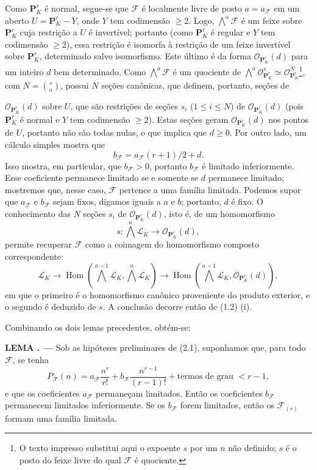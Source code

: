 \documentclass[11pt,twoside,openany]{book}
\numberwithin{equation}{section}
\newcommand{\src}[1]{%
  \phantomsection\hypertarget{src:#1}{}%
  \marginpar{\raggedleft\footnotesize\sffamily #1}%
}
\theoremstyle{plain}
\theoremstyle{definition}
\theoremstyle{remark}
\newcommand{\result}[2]{%
  \par\medskip\noindent\textbf{#1%
  \if\relax\detokenize{#2}\relax\else\space#2\fi. ---}\enspace
}
\newcommand{\FgaUnitKey}{frontmatter}
\renewcommand{\src}[1]{%
  \phantomsection\hypertarget{src:\FgaUnitKey:#1}{}%
  \marginpar{\raggedleft\footnotesize\sffamily #1}%
}
\begin{document}
Como $\mathbf P^r_K$ é normal, segue-se que $\mathcal F$ é localmente livre de
posto $a=a_{\mathcal F}$ em um aberto $U=\mathbf P^r_K-Y$, onde $Y$ tem
codimensão $\geq2$. Logo, $\bigwedge^a\mathcal F$ é um feixe sobre
$\mathbf P^r_K$ cuja restrição a $U$ é invertível; portanto (como
$\mathbf P^r_K$ é regular e $Y$ tem codimensão $\geq2$), essa restrição é
isomorfa à restrição de um feixe invertível sobre $\mathbf P^r_K$, determinado
salvo isomorfismo. Este último é da forma $\mathcal O_{\mathbf P^r_K}(d)$ para um
inteiro $d$ bem determinado. Como $\bigwedge^a\mathcal F$ é um quociente de
$\bigwedge^a\mathcal O_{\mathbf P^r_K}^{s}\simeq
\mathcal O_{\mathbf P^r_K}^{N}$\footnote{O texto impresso substitui aqui o
expoente $s$ por um $n$ não definido; $s$ é o posto do feixe livre do qual
$\mathcal F$ é quociente.}, com $N=\binom{s}{a}$, possui $N$ seções canônicas,
que definem, portanto, seções de
\src{257}
$\mathcal O_{\mathbf P^r_K}(d)$ sobre $U$, que são restrições de seções
$s_i$ ($1\leq i\leq N$) de $\mathcal O_{\mathbf P^r_K}(d)$ (pois
$\mathbf P^r_K$ é normal e $Y$ tem codimensão $\geq2$). Estas seções
geram $\mathcal O_{\mathbf P^r_K}(d)$ nos pontos de $U$, portanto não são
todas nulas, o que implica que $d\geq0$. Por outro lado, um cálculo simples
mostra que
\[
b_{\mathcal F}=a_{\mathcal F}(r+1)/2+d.
\]
Isso mostra, em particular, que $b_{\mathcal F}>0$, portanto
$b_{\mathcal F}$ é limitado inferiormente. Esse coeficiente permanece limitado
se e somente se $d$ permanece limitado; mostremos que, nesse caso, $\mathcal F$
pertence a uma família limitada. Podemos supor que $a_{\mathcal F}$ e
$b_{\mathcal F}$ sejam fixos, digamos iguais a $a$ e $b$; portanto, $d$ é fixo.
O conhecimento das $N$ seções
$s_i$ de $\mathcal O_{\mathbf P^r_K}(d)$, isto é, de um homomorfismo
\[
s:\bigwedge^a\mathcal L_K\longrightarrow\mathcal O_{\mathbf P^r_K}(d),
\]
permite recuperar $\mathcal F$ como a coimagem do homomorfismo composto
correspondente:
\[
\mathcal L_K\longrightarrow
\operatorname{Hom}\!\left(\bigwedge^{a-1}\mathcal L_K,
\bigwedge^a\mathcal L_K\right)\longrightarrow
\operatorname{Hom}\!\left(\bigwedge^{a-1}\mathcal L_K,
\mathcal O_{\mathbf P^r_K}(d)\right),
\]
em que o primeiro é o homomorfismo canônico proveniente do produto exterior, e
o segundo é deduzido de $s$. A conclusão decorre então de (1.2) (i).

Combinando os dois lemas precedentes, obtém-se:

\result{LEMA}{2.6} Sob as hipóteses preliminares de (2.1), suponhamos que, para
todo $\mathcal F$, se tenha
\[
P_{\mathcal F}(n)=a_{\mathcal F}\frac{n^r}{r!}
+b_{\mathcal F}\frac{n^{r-1}}{(r-1)!}
+\text{termos de grau $<r-1$},
\]
e que os coeficientes $a_{\mathcal F}$ permaneçam limitados. Então os
coeficientes $b_{\mathcal F}$ permanecem limitados inferiormente. Se os
$b_{\mathcal F}$ forem limitados, então os $\mathcal F_{(r)}$ formam uma família
limitada.
\end{document}
